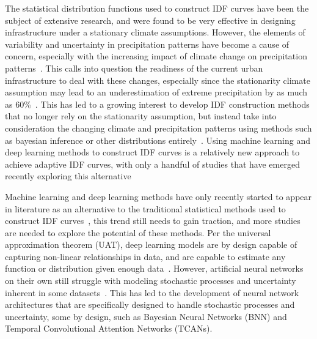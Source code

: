 The statistical distribution functions used to construct IDF curves have been the subject of extensive research, and were found to be very effective in designing infrastructure under a stationary climate assumptions. However, the elements of variability and uncertainty in precipitation patterns have become a cause of concern, especially with the increasing impact of climate change on precipitation patterns~\cite{Cheng2014}. This calls into question the readiness of the current urban infrastructure to deal with these changes, especially since the stationarity climate assumption may lead to an underestimation of extreme precipitation by as much as 60\%~\cite{Cheng2014}. This has led to a growing interest to develop IDF construction methods that no longer rely on the stationarity assumption, but instead take into consideration the changing climate and precipitation patterns using methods such as bayesian inference or other distributions entirely~\cite{Cheng2014, hess-2020-173, hess-27-2075-2023, hess-25-6133-2021}. Using machine learning and deep learning methods to construct IDF curves is a relatively new approach to achieve adaptive IDF curves, with only a handful of studies that have emerged recently exploring this alternative~\cite{idfkoya}

\vspace{1em}

Machine learning and deep learning methods have only recently started to appear in literature as an alternative to the traditional statistical methods used to construct IDF curves~\cite{idfkoya}, this trend still needs to gain traction, and more studies are needed to explore the potential of these methods. Per the universal approximation theorem (UAT), deep learning models are by design capable of capturing non-linear relationships in data, and are capable to estimate any function or distribution given enough data~\cite{Goodfellow2016-sect6.4.1}. However, artificial neural networks on their own still struggle with modeling stochastic processes and uncertainty inherent in some datasets~\cite{thacker2020fundamentalissuesregardinguncertainties}. This has led to the development of neural network architectures that are specifically designed to handle stochastic processes and uncertainty, some by design, such as Bayesian Neural Networks (BNN) and Temporal Convolutional Attention Networks (TCANs).~\cite{lin2021tcan, goan2020} 

\vspace{1em}

